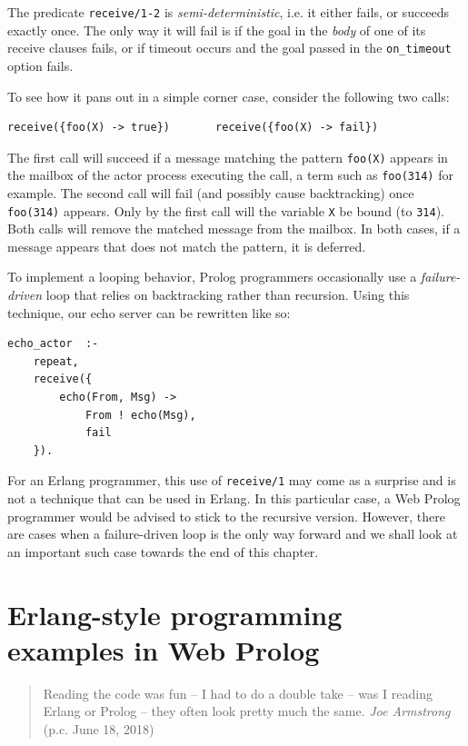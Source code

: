 The predicate \texttt{receive/1-2} is \textit{semi-deterministic}, i.e. it either fails, or succeeds exactly once. The only way it will fail is if the goal in the \textit{body} of one of its receive clauses fails, or if timeout occurs and the goal passed in the \texttt{on\_timeout} option fails. 

To see how it pans out in a simple corner case, consider the following two calls:

\begin{verbatim}
receive({foo(X) -> true})       receive({foo(X) -> fail})
\end{verbatim} 

\noindent The first call will succeed if a message matching the pattern \texttt{foo(X)} appears in the mailbox of the actor process executing the call, a term such as \texttt{foo(314)} for example. The second call will fail (and possibly cause backtracking) once \texttt{foo(314)} appears. Only by the first call will the variable \texttt{X} be bound (to \texttt{314}). Both calls will remove the matched message from the mailbox. In both cases, if a message appears that does not match the pattern, it is deferred.

To implement a looping behavior, Prolog programmers occasionally use a \textit{failure-driven} loop that relies on backtracking rather than recursion. Using this technique, our echo server can be rewritten like so:

\begin{verbatim}
echo_actor  :-
    repeat,        
    receive({             
        echo(From, Msg) -> 
            From ! echo(Msg),    
            fail   
    }).
\end{verbatim}

\noindent For an Erlang programmer, this use of \texttt{receive/1} may come as a surprise and is not a technique that can be used in Erlang. In this particular case, a Web Prolog programmer would be advised to stick to the recursive version. However, there are cases when a failure-driven loop is the only way forward and we shall look at an important such case towards the end of this chapter. %



\section{Erlang-style programming examples in Web Prolog}

\begin{quotation}
\noindent Reading the code was fun -- I had to do a double take -- was I reading Erlang or Prolog -- they often look pretty much the same.
\vspace{-0.4cm}
\flushright\textit{Joe Armstrong} (p.c. June 18, 2018)
\vspace{0.1cm}
\end{quotation}

